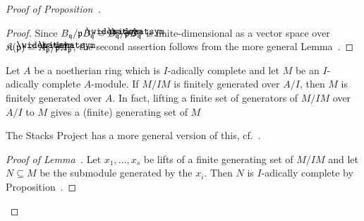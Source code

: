 \documentclass[a4paper,parskip=half,numbers=enddot, DIV=12]{scrreprt}
\begin{document}
\begin{proof}[Proof of Proposition~]
\begin{proof}
		Since $B_\qq/\pp B_\qq\cong \roof{B}_\qq/\pp\roof{B}_\qq$ is finite-dimensional as a vector space over $\KK(\pp)\cong \roof{A}_\pp/\pp\roof{A}_\pp$, the second assertion follows from the more general Lemma~.
	\end{proof}
	\begin{lem}
		Let $A$ be a noetherian ring which is $I$-adically complete and let $M$ be an $I$-adically complete $A$-module. If $M/IM$ is finitely generated over $A/I$, then $M$ is finitely generated over $A$. In fact, lifting a finite set of generators of $M/IM$ over $A/I$ to $M$ gives a (finite) generating set of $M$
	\end{lem}
	\begin{rem}
		The Stacks Project has a more general version of this, cf.\ \cite[]{stacks-project}.
	\end{rem}
	\begin{proof}[Proof of Lemma~]
		Let $x_1,\ldots,x_s$ be lifts of a finite generating set of $M/IM$ and let $N\subseteq M$ be the submodule generated by the $x_i$. Then $N$ is $I$-adically complete by Proposition~.
		

\end{proof}
\end{proof}
\end{document}
